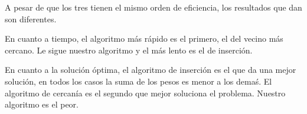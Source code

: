 \documentclass[a4]{article}
\begin{document}
A pesar de que los tres tienen el mismo orden de eficiencia, los resultados que dan son diferentes.

En cuanto a tiempo, el algoritmo más rápido es el primero, el del vecino más cercano. Le sigue nuestro algoritmo y el más lento es el de inserción.

En cuanto a la solución óptima, el algoritmo de inserción es el que da una mejor solución, en todos los casos la suma de los pesos es menor a los demaś. El algoritmo de cercanía es el segundo que mejor soluciona el problema. Nuestro algoritmo es el peor.

\begin{figure}[H]
  \centering
{}
\end{figure}
\end{document}
